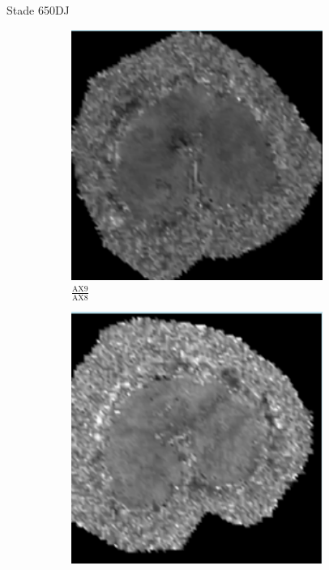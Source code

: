 \documentclass[10pt]{beamer}
\begin{document}
\begin{frame}{Stade 650DJ}
\begin{figure}[ht]
\begin{subfigure}[t]{0.25\textwidth}
      \includegraphics[width=0.9\textwidth]{fig/t2_650_slice8}
      \caption{$\frac{\text{AX9}}{\text{AX8}}$}
      \label{subfig:density_650_slice11}
    \end{subfigure}%
    \vrule%
    \begin{subfigure}[t]{0.25\textwidth}
      \centering
      \includegraphics[width=0.9\textwidth]{fig/density_650_slice10}

\end{subfigure}
\end{figure}
\end{frame}
\end{document}

